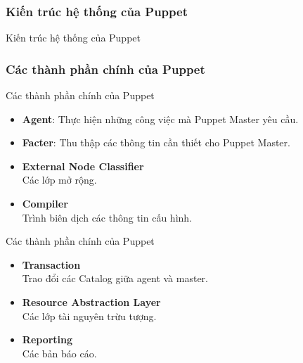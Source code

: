 \documentclass[14pt]{beamer}
\begin{document}
\subsubsection*{Kiến trúc hệ thống của Puppet}
\begin{frame}{Kiến trúc hệ thống của Puppet}
  \begin{center}
  \end{center}
\end{frame}

\subsubsection*{Các thành phần chính của Puppet}
\begin{frame}{Các thành phần chính của Puppet}
  \begin{itemize}
    \item \textbf{Agent}: Thực hiện những công việc mà Puppet Master yêu cầu.
    \pause
    \item \textbf{Facter}: Thu thập các thông tin cần thiết cho Puppet Master.
    \pause
    \item \textbf{External Node Classifier}\\ Các lớp mở rộng.
    \pause
    \item \textbf{Compiler} \\ Trình biên dịch các thông tin cấu hình.
  \end{itemize}
\end{frame}

\begin{frame}{Các thành phần chính của Puppet}
  \begin{itemize}
    \item \textbf{Transaction} \\ Trao đổi các Catalog giữa agent và master.
    \pause
    \item \textbf{Resource Abstraction Layer} \\ Các lớp tài nguyên trừu tượng.
    \pause
    \item \textbf{Reporting} \\ Các bản báo cáo.
  \end{itemize}
\end{frame}
\end{document}
